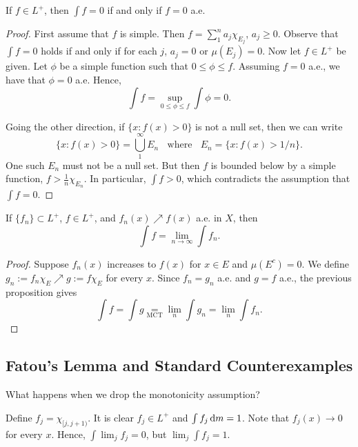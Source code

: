 \documentclass[12pt]{article} %
\begin{document}
\begin{proposition}
    If $f \in L^+$, then $\int f = 0$ if and only if $f = 0$ a.e.
\end{proposition}

\begin{proof}
    First assume that $f$ is simple. Then $f = \sum_1^n a_j \chi_{E_j}$, $a_j \geq 0$. Observe that $\int f = 0$ holds if and only if for each $j$, $a_j = 0$ or $\mu(E_j) = 0$. Now let $f \in L^+$ be given. Let $\phi$ be a simple function such that $0 \leq \phi \leq f$. Assuming $f = 0$ a.e., we have that $\phi = 0$ a.e. Hence, \[\int f = \sup_{0 \leq \phi \leq f} \int \phi = 0.\]

    Going the other direction, if $\{x : f(x) > 0\}$ is not a null set, then we can write \[\{x : f(x) > 0\} = \bigcup_1^\infty E_n \ \ \ \ \text{where} \ \ \ \ E_n = \{x : f(x) > 1/n\}.\] One such $E_n$ must not be a null set. But then $f$ is bounded below by a simple function, $f > \frac{1}{n} \chi_{E_n}$. In particular, $\int f > 0$, which contradicts the assumption that $\int f = 0$.
\end{proof}

\begin{corollary}
    If $\{f_n\} \subset L^+$, $f \in L^+$, and $f_n(x) \nearrow f(x)$ a.e. in $X$, then \[\int f = \lim_{n \to \infty} \int f_n.\]
\end{corollary}

\begin{proof}
    Suppose $f_n(x)$ increases to $f(x)$ for $x \in E$ and $\mu(E^c) = 0$. We define $g_n := f_n \chi_E \nearrow g := f \chi_E$ for every $x$. Since $f_n = g_n$ a.e. and $g = f$ a.e., the previous proposition gives \[\int f = \int g \underset{\text{MCT}}{=} \lim_n \int g_n = \lim_n \int f_n.\]
\end{proof}

\subsection{Fatou's Lemma and Standard Counterexamples}

What happens when we drop the monotonicity assumption?

\begin{example}
    Define $f_j = \chi_{[j, j+1)}$. It is clear $f_j \in L^+$ and $\int f_j \, \mathrm{d} m = 1$. Note that $f_j(x) \to 0$ for every $x$. Hence, $\int \lim_j f_j = 0$, but $\lim_j \int f_j = 1$.
\end{example}
\end{document}
